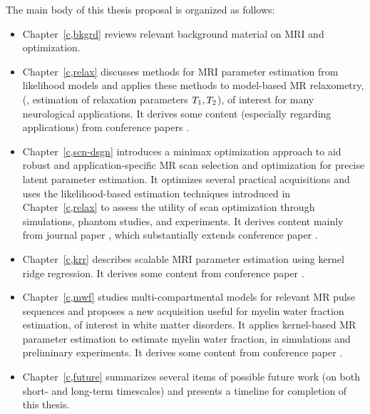 The main body of this thesis proposal is organized as follows:
\begin{itemize}
\item 
	Chapter~\ref{c,bkgrd} reviews 
	relevant background material
	on MRI and optimization.
\item 
	Chapter~\ref{c,relax} discusses methods 
	for MRI parameter estimation 
	from likelihood models 
	and applies these methods 
	to model-based MR relaxometry, 
	(\ie, estimation of relaxation parameters $T_1,T_2$),
	of interest for many neurological applications.
	It derives some content 
	(especially regarding applications)
	from conference papers 
	\cite{nataraj:14:rje,nataraj:14:mbe}.
\item
	Chapter~\ref{c,scn-dsgn} introduces
	a minimax optimization approach
	to aid robust and application-specific 
	MR scan selection and optimization 
	for precise latent parameter estimation.
	It optimizes several practical acquisitions 
	and uses the likelihood-based estimation techniques 
	introduced in Chapter~\ref{c,relax}
	to assess the utility
	of scan optimization
	through simulations, 
	phantom studies, 
	and \invivo experiments.
	It derives content
	mainly from journal paper
	\cite{nataraj::oms},
	which substantially extends conference paper
	\cite{nataraj:15:amm}.
\item 
	Chapter~\ref{c,krr} describes 
	scalable MRI parameter estimation
	using kernel ridge regression.
	It derives some content 
	from conference paper
	\cite{nataraj:17:dfm}.
\item
	Chapter~\ref{c,mwf} studies multi-compartmental models
	for relevant MR pulse sequences
	and proposes a new acquisition 
	useful for myelin water fraction estimation,
	of interest in white matter disorders.
	It applies kernel-based MR parameter estimation
	to estimate myelin water fraction,
	in simulations and preliminary \invivo experiments.
	It derives some content from conference paper
	\cite{nataraj:17:mwf}.
\begin{comment}
\item
	Chapter~\ref{c,ss-rf} presents
	some relatively immature ideas
	on steady-state radiofrequency (RF) pulse design
	as well as associated challenges.
	This work is presently unpublished
	and may offer avenues for further research.
\end{comment}
\item 
	Chapter~\ref{c,future} summarizes several items 
	of possible future work
	(on both short- and long-term timescales) 
	and presents a timeline
	for completion of this thesis.
\end{itemize}

